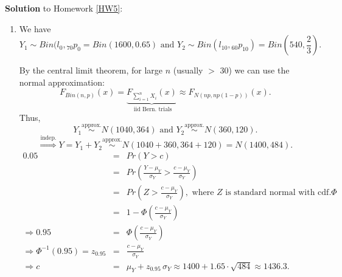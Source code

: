 \documentclass[11pt,fleqn,oneside]{book}
\begin{document}
\noindent \textbf{Solution} to Homework \ref{HW5}:
\footnotesize
\begin{enumerate}
\item
We have
$$
Y_1 \sim Bin(l_0,{_{70}p_0} = Bin(1600,0.65) \text{ and } Y_2 \sim Bin(l_{10},{_{60}p_{10}}) = Bin(540,\frac{2}{3}).
$$

By the central limit theorem, for large $n$ (usually $>$ 30) we can use the normal approximation:
$$
F_{Bin(n,p)}(x) = \underbrace{F_{\sum_{i=1}^n X_i}(x)}_{\text{ iid Bern.\ trials}} \approx F_{N(np,np(1-p))}(x).
$$
Thus,
$$
Y_1 \stackrel{\text{approx.}} {\sim} N(1040,364) \text{ and } Y_2 \stackrel{\text{approx.}}{\sim}N(360,120).
$$
$$
\stackrel{\text{indep.}}{\Rightarrow}Y= Y_1 + Y_2 \stackrel{\text{approx.}}{\sim} N(1040 + 360, 364+120) = N(1400,484).
$$
\begin{eqnarray*}
0.05 &=& Pr(Y > c) \\
&=& Pr(\frac{Y-\mu_Y}{\sigma_Y} > \frac{c - \mu_Y}{\sigma_Y}) \\
&=& Pr(Z >  \frac{c - \mu_Y}{\sigma_Y} ), \text{ where } Z \text{ is standard normal with cdf.} \Phi \\
&=& 1 - \Phi( \frac{c - \mu_Y}{\sigma_Y} ) \\
\Rightarrow 0.95 &=& \Phi( \frac{c - \mu_Y}{\sigma_Y} ) \\
\Rightarrow \Phi^{-1}(0.95) = z_{0.95} &=& \frac{c - \mu_Y}{\sigma_Y} \\
\Rightarrow c &=& \mu_Y + z_{0.95}\,\sigma_Y \approx 1400 + 1.65 \cdot \sqrt{484} \approx 1436.3.
\end{eqnarray*}


\end{enumerate}
\end{document}
